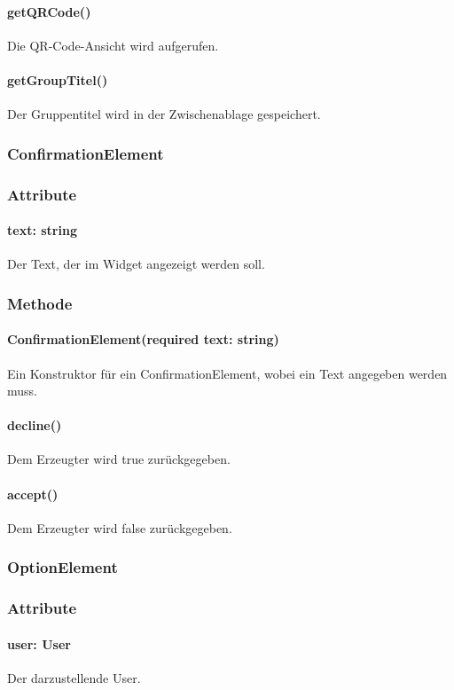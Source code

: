 \documentclass[parskip=full]{scrartcl}
\begin{document}
\paragraph*{getQRCode()} Die QR-Code-Ansicht wird aufgerufen.
\paragraph*{getGroupTitel()} Der Gruppentitel wird in der Zwischenablage gespeichert.

\subsubsection{ConfirmationElement} \label{sec:ConfirmationElement}
\subsubsection*{Attribute}
\paragraph*{text: string} Der Text, der im Widget angezeigt werden soll.

\subsubsection*{Methode}
\paragraph*{ConfirmationElement(required text: string)} Ein Konstruktor für ein ConfirmationElement, wobei ein Text angegeben werden muss.
\paragraph*{decline()} Dem Erzeugter wird true zurückgegeben.
\paragraph*{accept()} Dem Erzeugter wird false zurückgegeben.


\subsubsection{OptionElement}
\subsubsection*{Attribute}
\paragraph*{user: User} Der darzustellende User.
\end{document}
